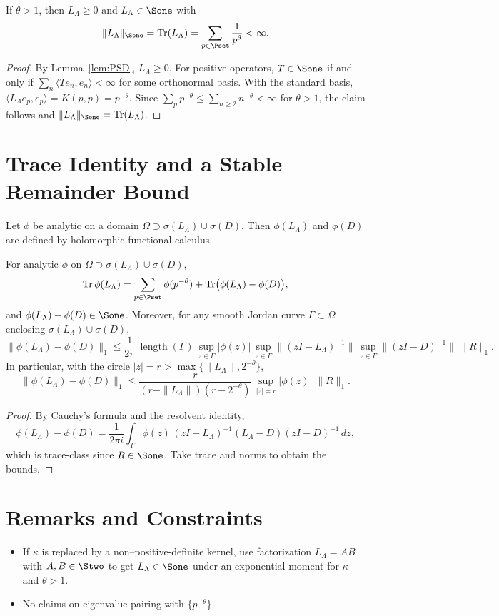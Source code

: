 \documentclass[11pt]{nyjm}
\numberwithin{equation}{section}
\begin{document}
\begin{theorem}
\label{thm:T3prime}
If $\theta>1$, then $L_\Lambda\ge0$ and $L_\Lambda\in \Sone$ with
\[
\|L_\Lambda\|_{\Sone}=\mathrm{Tr}(L_\Lambda)=\sum_{p\in \Pset}\frac{1}{p^{\theta}}<\infty.
\]
\end{theorem}
\begin{proof}
By Lemma~\ref{lem:PSD}, $L_\Lambda\ge0$. For positive operators, $T\in \Sone$ if and only if $\sum_n\langle Te_n,e_n\rangle<\infty$ for some orthonormal basis. With the standard basis, $\langle L_\Lambda e_p,e_p\rangle=K(p,p)=p^{-\theta}$. Since $\sum_{p}p^{-\theta}\le \sum_{n\ge2}n^{-\theta}<\infty$ for $\theta>1$, the claim follows and $\|L_\Lambda\|_{\Sone}=\mathrm{Tr}(L_\Lambda)$.
\end{proof}

\section{Trace Identity and a Stable Remainder Bound}
Let $\phi$ be analytic on a domain $\Omega\supset \sigma(L_\Lambda)\cup \sigma(D)$. Then $\phi(L_\Lambda)$ and $\phi(D)$ are defined by holomorphic functional calculus.

\begin{theorem}
\label{thm:trace}
For analytic $\phi$ on $\Omega\supset \sigma(L_\Lambda)\cup \sigma(D)$,
\[
\mathrm{Tr}\,\phi(L_\Lambda)=\sum_{p\in \Pset}\phi(p^{-\theta})+\mathrm{Tr}\big(\phi(L_\Lambda)-\phi(D)\big),
\]
and $ \phi(L_\Lambda)-\phi(D)\in \Sone$.
Moreover, for any smooth Jordan curve $\Gamma\subset\Omega$ enclosing $\sigma(L_\Lambda)\cup \sigma(D)$,
\[
\|\phi(L_\Lambda)-\phi(D)\|_{1}\le \frac{1}{2\pi}\,\operatorname{length}(\Gamma)\,
\sup_{z\in\Gamma}|\phi(z)|\,
\sup_{z\in\Gamma}\|(zI-L_\Lambda)^{-1}\|\,
\sup_{z\in\Gamma}\|(zI-D)^{-1}\|\,
\|R\|_{1}.
\]
In particular, with the circle $|z|=r>\max\{\|L_\Lambda\|,2^{-\theta}\}$,
\[
\|\phi(L_\Lambda)-\phi(D)\|_{1}\le
\frac{r}{(r-\|L_\Lambda\|)(r-2^{-\theta})}\,
\sup_{|z|=r}|\phi(z)|\;\|R\|_{1}.
\]
\end{theorem}
\begin{proof}
By Cauchy's formula and the resolvent identity,
\[
\phi(L_\Lambda)-\phi(D)=\frac{1}{2\pi i}\int_\Gamma \phi(z)\,(zI-L_\Lambda)^{-1}(L_\Lambda-D)(zI-D)^{-1}\,dz,
\]
which is trace-class since $R\in \Sone$. Take trace and norms to obtain the bounds.
\end{proof}

\section{Remarks and Constraints}
\begin{itemize}
\item If $\kappa$ is replaced by a non--positive-definite kernel, use factorization $L_\Lambda=AB$ with $A,B\in\Stwo$ to get $L_\Lambda\in \Sone$ under an exponential moment for $\kappa$ and $\theta>1$.
\item No claims on eigenvalue pairing with $\{p^{-\theta}\}$.
\end{itemize}
\end{document}
